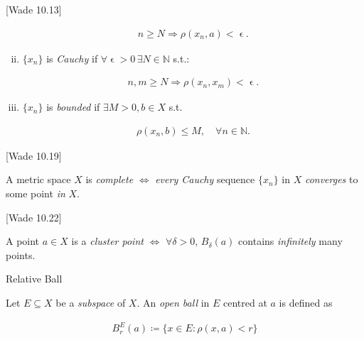 \documentclass[10pt]{article} %
\newcommand{\cw}[1]{[Wade #1]}
\renewcommand{\leq}{\leqslant}
\renewcommand{\geq}{\geqslant}
\begin{document}
\begin{multicols}{3}
\begin{definition}{\cw{10.13}}{}
\begin{enumerate}[i)]
                \begin{align*}
                    n \geq N \Rightarrow \rho(x_n,a) < \upvarepsilon.
                \end{align*}

            \item $\{x_n\}$ is \emph{Cauchy} if $\forall \upvarepsilon > 0 \, \exists N \in \mathbb{N}$ s.t.:

                \begin{align*}
                    n,m \geq N \Rightarrow \rho(x_n,x_m) < \upvarepsilon.
                \end{align*}

            \item $\{x_n\}$ is \emph{bounded} if $\exists M > 0, b \in X$ s.t.

                \begin{align*}
                    \rho(x_n,b) \leq M, \quad \forall n \in \mathbb{N}.
                \end{align*}
        \end{enumerate}

\end{definition}

\begin{definition}{\cw{10.19}}{}

    A metric space $X$ is \emph{complete} $\Leftrightarrow$ \emph{every Cauchy} sequence $\{x_n\}$ in $X$ \emph{converges} to some point \emph{in} $X$.

\end{definition}

\begin{definition}{\cw{10.22}}{}

    A point $a \in X$ is a \emph{cluster point} $\Leftrightarrow$ $\forall \delta > 0$, $B_{\delta}(a)$ contains \emph{infinitely} many points.

\end{definition}

\begin{definition}{}{Relative Ball}

    Let $E \subseteq X$ be a \emph{subspace} of $X$. An \emph{open ball} in $E$ centred at $a$ is defined as

        \begin{align*}
            B_r^E(a) \coloneqq \{ x \in E: \rho(x,a) < r \}
        \end{align*}


\end{definition}
\end{multicols}
\end{document}
